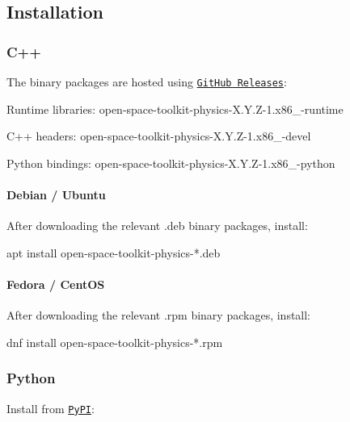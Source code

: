 \subsection*{Installation}

\subsubsection*{C++}

The binary packages are hosted using \href{https://github.com/open-space-collective/open-space-toolkit-physics/releases}{\tt Git\+Hub Releases}\+:


\begin{DoxyItemize}
\item Runtime libraries\+: {\ttfamily open-\/space-\/toolkit-\/physics-\/\+X.\+Y.\+Z-\/1.\+x86\+\_-\/runtime}
\item C++ headers\+: {\ttfamily open-\/space-\/toolkit-\/physics-\/\+X.\+Y.\+Z-\/1.\+x86\+\_-\/devel}
\item Python bindings\+: {\ttfamily open-\/space-\/toolkit-\/physics-\/\+X.\+Y.\+Z-\/1.\+x86\+\_-\/python}
\end{DoxyItemize}

\paragraph*{Debian / Ubuntu}

After downloading the relevant {\ttfamily .deb} binary packages, install\+:


\begin{DoxyCode}
apt install open-space-toolkit-physics-*.deb
\end{DoxyCode}


\paragraph*{Fedora / Cent\+OS}

After downloading the relevant {\ttfamily .rpm} binary packages, install\+:


\begin{DoxyCode}
dnf install open-space-toolkit-physics-*.rpm
\end{DoxyCode}


\subsubsection*{Python}

Install from \href{https://pypi.org/project/open-space-toolkit-physics/}{\tt Py\+PI}\+:


